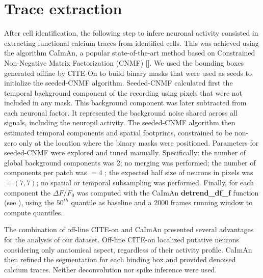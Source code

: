\section{Trace extraction}
\label{chap3:sec:5:trace_extraction}
After cell identification, the following step to infere neuronal activity consisted in extracting functional calcium traces from identified cells. 
This was achieved using the algorithm CaImAn, a popular state-of-the-art method based on Constrained Non-Negative Matrix Factorization (CNMF) [\cite{giovannucci2019}].
We used the bounding boxes generated offline by CITE-On to build binary masks that were used as seeds to initialize the seeded-CNMF algorithm.
Seeded-CNMF calculated first the temporal background component of the recording using pixels that were not included in any mask. This background component was later subtracted from each neuronal factor. 
It represented the background noise shared across all signals, including the neuropil activity.
The seeded-CNMF algorithm then estimated temporal components and spatial footprints, constrained to be non-zero only at the location where the binary masks were positioned.
Parameters for seeded-CNMF were explored and tuned manually. Specifically: the number of global background components was 2; no merging was performed; the number of components per patch was $= 4$ ; the expected half size of neurons in pixels was $= (7,7)$; no spatial or temporal subsampling was performed.
Finally, for each component the $\Delta F/F_0$ was computed with the CaImAn \textbf{detrend\_df\_f} function (see \cite{giovannucci2019}), using the $50^{th}$ quantile as baseline and a 2000 frames running window to compute quantiles.  

The combination of off-line CITE-on and CaImAn presented several advantages for the analysis of our dataset.
Off-line CITE-on localized putative neurons considering only anatomical aspect, regardless of their activity profile.
CaImAn then refined the segmentation for each binding box and provided denoised calcium traces. 
Neither deconvolution nor spike inference were used. 
